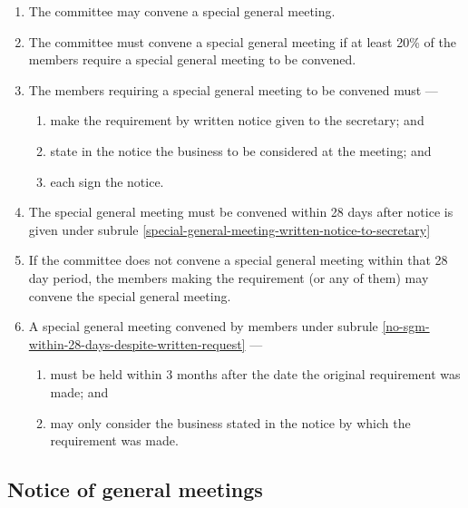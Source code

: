 \documentclass[../constitution.tex]{subfiles}
\begin{document}
\begin{enumerate}

\item The committee may convene a special general meeting.
\item The committee must convene a special general meeting if at least 20\% of the members require a special general meeting to be convened.
\item The members requiring a special general meeting to be convened must ---

  \begin{enumerate}
  
  \item make the requirement by written notice given to the secretary; and \label{special-general-meeting-written-notice-to-secretary}
  \item state in the notice the business to be considered at the meeting; and
  \item each sign the notice.
  \end{enumerate}
\item The special general meeting must be convened within 28 days after notice is given under subrule \ref{special-general-meeting-written-notice-to-secretary}
\item If the committee does not convene a special general meeting within that 28 day period, the members making the requirement (or any of them) may convene the special general meeting. \label{no-sgm-within-28-days-despite-written-request}
\item A special general meeting convened by members under subrule \ref{no-sgm-within-28-days-despite-written-request} ---

  \begin{enumerate}
  
  \item must be held within 3 months after the date the original requirement was made; and
  \item may only consider the business stated in the notice by which the requirement was made.
  \end{enumerate}
\end{enumerate}

\hypertarget{notice-of-general-meetings}{%
\subsection{Notice of general meetings}\label{notice-of-general-meetings}}
\end{document}

